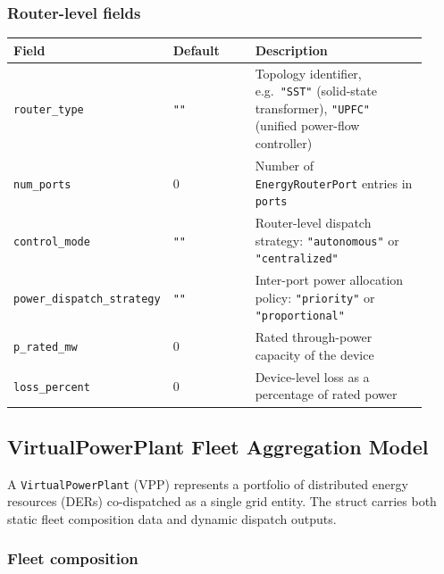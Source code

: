 \subsubsection*{Router-level fields}

\begin{longtable}{L{0.30\linewidth}L{0.20\linewidth}L{0.42\linewidth}}
\toprule
Field & Default & Description \\
\midrule
\endhead
\texttt{router\_type} & \texttt{""} & Topology identifier, e.g.\ \texttt{"SST"} (solid-state transformer), \texttt{"UPFC"} (unified power-flow controller) \\
\texttt{num\_ports} & 0 & Number of \texttt{EnergyRouterPort} entries in \texttt{ports} \\
\texttt{control\_mode} & \texttt{""} & Router-level dispatch strategy: \texttt{"autonomous"} or \texttt{"centralized"} \\
\texttt{power\_dispatch\_strategy} & \texttt{""} & Inter-port power allocation policy: \texttt{"priority"} or \texttt{"proportional"} \\
\texttt{p\_rated\_mw} & 0 & Rated through-power capacity of the device \\
\texttt{loss\_percent} & 0 & Device-level loss as a percentage of rated power \\
\bottomrule
\end{longtable}

\subsection{VirtualPowerPlant Fleet Aggregation Model}
\label{sec:vpp-model}

A \texttt{VirtualPowerPlant} (VPP) represents a portfolio of distributed
energy resources (DERs) co-dispatched as a single grid entity.  The struct
carries both static fleet composition data and dynamic dispatch outputs.

\subsubsection*{Fleet composition}

